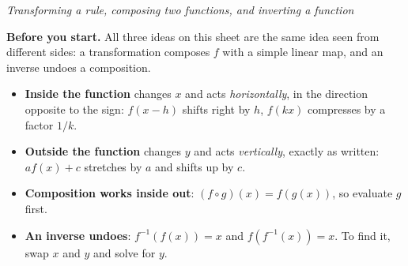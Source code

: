 \documentclass[12pt]{article}
\begin{document}

\begin{center}
\textit{Transforming a rule, composing two functions, and inverting a function}
\end{center}

\noindent\textbf{Before you start.} All three ideas on this sheet are the same
idea seen from different sides: a transformation composes $f$ with a simple
linear map, and an inverse undoes a composition.

\begin{itemize}[leftmargin=1.2cm, itemsep=2pt, topsep=2pt]
\item \textbf{Inside the function} changes $x$ and acts \emph{horizontally}, in
the direction opposite to the sign: $f(x-h)$ shifts right by $h$, $f(kx)$
compresses by a factor $1/k$.
\item \textbf{Outside the function} changes $y$ and acts \emph{vertically},
exactly as written: $af(x)+c$ stretches by $a$ and shifts up by $c$.
\item \textbf{Composition works inside out}: $(f\circ g)(x)=f(g(x))$, so
evaluate $g$ first.
\item \textbf{An inverse undoes}: $f^{-1}(f(x))=x$ and $f(f^{-1}(x))=x$. To
find it, swap $x$ and $y$ and solve for $y$.
\end{itemize}

\medskip





\end{document}
